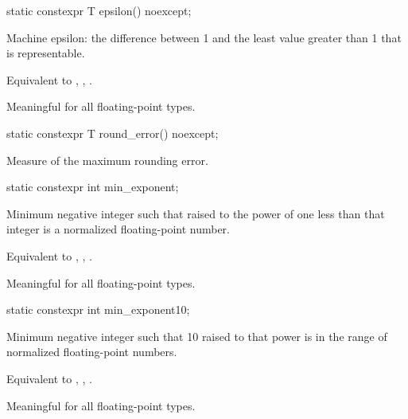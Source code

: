 %
\begin{itemdecl}
static constexpr T epsilon() noexcept;
\end{itemdecl}

\begin{itemdescr}
\pnum
Machine epsilon:  the difference between 1 and the least value greater than 1
that is representable.
\begin{footnote}
Equivalent to , , .
\end{footnote}

\pnum
Meaningful for all floating-point types.
\end{itemdescr}

%
\begin{itemdecl}
static constexpr T round_error() noexcept;
\end{itemdecl}

\begin{itemdescr}
\pnum
Measure of the maximum rounding error.
\end{itemdescr}

%
\begin{itemdecl}
static constexpr int min_exponent;
\end{itemdecl}

\begin{itemdescr}
\pnum
Minimum negative integer such that
raised to the power of one less than that integer is a normalized floating-point
number.
\begin{footnote}
Equivalent to , ,
.
\end{footnote}

\pnum
Meaningful for all floating-point types.
\end{itemdescr}

%
\begin{itemdecl}
static constexpr int min_exponent10;
\end{itemdecl}

\begin{itemdescr}
\pnum
Minimum negative integer such that 10 raised to that power is in the range
of normalized floating-point numbers.
\begin{footnote}
Equivalent to
, , .
\end{footnote}

\pnum
Meaningful for all floating-point types.
\end{itemdescr}


